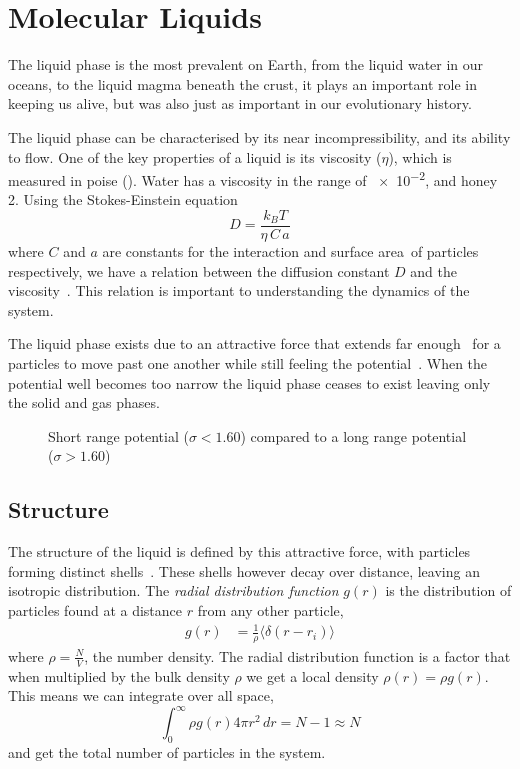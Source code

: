 \begin{figure}
    \caption{}
    \label{fig:}
\end{figure}

\section{Molecular Liquids}
The liquid phase is the most prevalent on Earth, from the liquid water in our oceans, to the liquid magma beneath the crust, it plays an important role in keeping us alive, but was also just as important in our evolutionary history.

The liquid phase can be characterised by its near incompressibility, and its ability to flow. One of the key properties of a liquid is its viscosity ($\eta$), which is measured in poise (\si{\poise}). Water has a viscosity in the range of \SI{e-2}{\poise}, and honey \SI{2}{\poise}. Using the Stokes-Einstein equation
\begin{equation}
    D=\frac{k_B T}{\eta\,C\,a}
\end{equation}
where $C$ and $a$ are constants for the interaction and surface area~\tocheck of particles respectively, we have a relation between the diffusion constant $D$ and the viscosity~\tocite. This relation is important to understanding the dynamics of the system.

The liquid phase exists due to an attractive force that extends far enough~ for a particles to move past one another while still feeling the potential~\cite{tejero:94}. When the potential well becomes too narrow the liquid phase ceases to exist leaving only the solid and gas phases.

\begin{figure}
    \label{fig:potentials}
    \caption{Short range potential ($\sigma < 1.60$) compared to a long range potential ($\sigma > 1.60$)}
\end{figure}

\subsection{Structure}
The structure of the liquid is defined by this attractive force, with particles forming distinct shells~. These shells however decay over distance, leaving an isotropic distribution. The \emph{radial distribution function} $g(r)$ is the distribution of particles found at a distance $r$ from any other particle,
\begin{align}
    g(r) &= \frac{1}{\rho} \langle \delta(r - r_i) \rangle
\end{align}
where $\rho = \frac{N}{V}$, the number density. The radial distribution function is a factor that when multiplied by the bulk density $\rho$ we get a local density $\rho(r) = \rho g(r)$. This means we can integrate over all space,
\begin{equation}
    \int_0^\infty \rho g(r) 4 \pi r^2\,dr = N-1 \approx N
\end{equation}
and get the total number of particles in the system.


